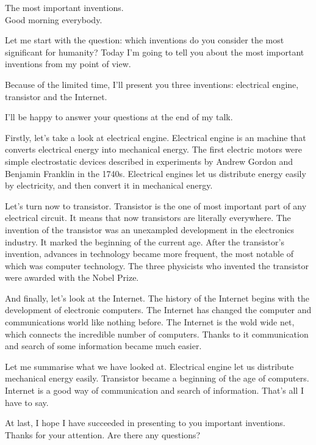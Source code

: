 \documentclass[a4paper,16pt]{article}
\begin{document}
\newpage
The most important inventions.\\

    Good morning everybody.

    Let me start with the question: which inventions do you consider the most significant for humanity? Today I’m going to tell you about the most important inventions from my point of view.

    Because of the limited time, I’ll present you three inventions: electrical engine, transistor and the Internet.

    I’ll be happy to answer your questions at the end of my talk.

    Firstly, let’s take a look at electrical engine.
    Electrical engine is an machine that converts electrical energy into mechanical energy. The first electric motors were simple electrostatic devices described in experiments by Andrew Gordon and Benjamin Franklin in the 1740s. Electrical engines let us distribute energy easily by electricity, and then convert it in mechanical energy.

    Let’s turn now to transistor.
    Transistor is the one of most important part of any electrical circuit. It means that now transistors are literally everywhere. The invention of the transistor was an unexampled development in the electronics industry. It marked the beginning of the current age. After the transistor's invention, advances in technology became more frequent, the most notable of which was computer technology. The three physicists who invented the transistor were awarded with the Nobel Prize.

    And finally, let’s look at the Internet.
    The history of the Internet begins with the development of electronic computers. The Internet has changed the computer and communications world like nothing before. The Internet is the wold wide net, which connects the incredible number of computers. Thanks to it communication and search of some information became much easier.

    Let me summarise what we have looked at.
    Electrical engine let us distribute mechanical energy easily.
    Transistor became a beginning of the age of computers.
    Internet is a good way of communication and search of information.
    That’s all I have to say.

    At last, I hope I have succeeded in presenting to you important inventions.
    Thanks for your attention.
    Are there any questions?
\end{document}
